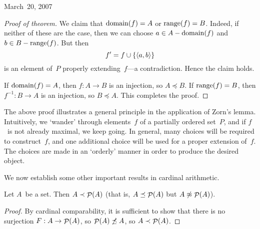 \begin{lecture}{March~20, 2007}
\begin{proof}[Proof of theorem]
We claim that \(\operatorname{domain}(f)=A\) or \(\operatorname{range}(f)=B\). Indeed, if neither of these are the case, then we can choose \(a\in A-\operatorname{domain}(f)\) and \(b\in B-\operatorname{range}(f)\). But then
\[f'=f\cup\{\langle{a},{b}\rangle\}\]
is an element of~\(P\) properly extending~\(f\)---a contradiction. Hence the claim holds.

If \(\operatorname{domain}(f)=A\), then \(f:A\to B\) is an injection, so \(A\preceq B\). If \(\operatorname{range}(f)=B\), then \(f^{-1}:B\to A\) is an injection, so \(B\preceq A\). This completes the proof.
\end{proof}
\noindent The above proof illustrates a general principle in the application of Zorn's lemma. Intuitively, we `wander' through elements~\(f\) of a partially ordered set~\(P\), and if \(f\)~is not already maximal, we keep going. In general, many choices will be required to construct~\(f\), and one additional choice will be used for a proper extension of~\(f\). The choices are made in an `orderly' manner in order to produce the desired object.

We now establish some other important results in cardinal arithmetic.
\begin{thm}
Let \(A\)~be a set. Then \(A\prec\mathop{\mathcal{P}}(A)\) (that is, \(A\preceq\mathop{\mathcal{P}}(A)\) but \(A\not\approx\mathop{\mathcal{P}}(A)\)).
\end{thm}
\begin{proof}
By cardinal comparability, it is sufficient to show that there is no surjection \(F:A\to\mathop{\mathcal{P}}(A)\), so \(\mathop{\mathcal{P}}(A)\not\preceq A\), so \(A\prec\mathop{\mathcal{P}}(A)\).


\end{proof}
\end{lecture}
